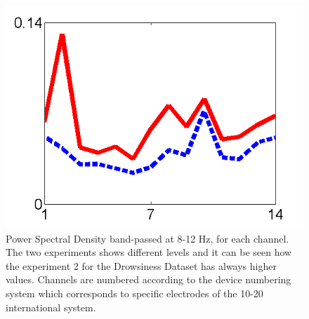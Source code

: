    \begin{figure}[thpb]
      \centering
      \includegraphics[scale=0.4]{images/PSDExperiment1VsExperiment5.png}
      \caption{Power Spectral Density band-passed at 8-12 Hz, for each channel.  The two experiments shows different levels and it can be seen how the experiment 2 for the Drowsiness Dataset has always higher values.  Channels are numbered according to the device numbering system which corresponds to specific electrodes of the 10-20 international system\cite{c6,c11}. }
      \label{psd}
   \end{figure}
   

